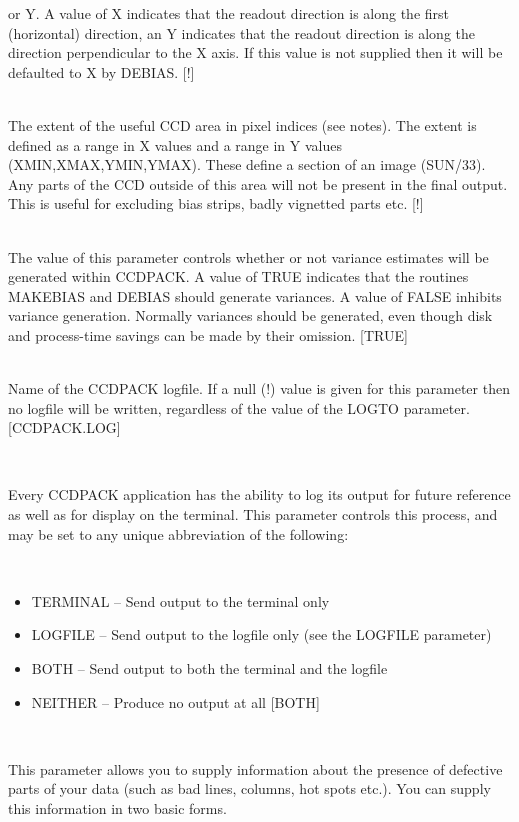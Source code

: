 \documentclass[twoside,11pt]{article}
\newcommand{\htmlref}[2]{#1}
\newcommand{\xlabel}[1]{}
\renewcommand{\_}{\texttt{\symbol{95}}}
\newcommand{\xroutine}[1]{\htmlref{{\sc #1}}{#1}}
\newcommand{\sstsubsection}[1]{ \item[{#1}] \mbox{} \\}
\newcommand{\sstitemlist}[1]{
  \mbox{} \\
  \vspace{-3.5ex}
  \begin{itemize}
     #1
  \end{itemize}
}
\newcommand{\sstitem}{\item}
\newcommand{\sstsubsection}[1]{\item[{#1}]}
\newcommand{\sstitemlist}[1]{
      \begin{itemize}
         #1
      \end{itemize}
      \\
   }
\newcommand{\sstitem}{\item}
\begin{document}
{{{         or Y.  A value of X indicates that the readout direction is
         along the first (horizontal) direction, an Y indicates that
         the readout direction is along the direction perpendicular to
         the X axis. If this value is not supplied then it will be
         defaulted to X by \xroutine{DEBIAS}.
         [!]
      }
      \sstsubsection{
         \xlabel{CCDextent}
         EXTENT( 4 ) = \_INTEGER (Read and Write)
      } {
         The extent of the useful CCD area in pixel indices (see notes).
         The extent is defined as a range in X values and a range in Y
         values (XMIN,XMAX,YMIN,YMAX). These define a section of an image
         (SUN/33). Any parts of the CCD outside of this area will not
         be present in the final output. This is useful for excluding
         bias strips, badly vignetted parts etc.
         [!]
      }
      \sstsubsection{
         GENVAR = \_LOGICAL (Read and Write)
      } {
         The value of this parameter controls whether or not variance
         estimates will be generated within CCDPACK. A value of TRUE
         indicates that the routines \xroutine{MAKEBIAS} and \xroutine{DEBIAS} should generate
         variances. A value of FALSE inhibits variance generation.
         Normally variances should be generated, even though disk and
         process-time savings can be made by their omission.
         [TRUE]
      }
      \sstsubsection{
         LOGFILE = FILENAME (Read and Write)
      } {
         Name of the CCDPACK logfile.  If a null (!) value is given for
         this parameter then no logfile will be written, regardless of
         the value of the LOGTO parameter.
         [CCDPACK.LOG]
      }
      \sstsubsection{
         LOGTO = LITERAL (Read and Write)
      } {
         Every CCDPACK application has the ability to log its output
         for future reference as well as for display on the terminal.
         This parameter controls this process, and may be set to any
         unique abbreviation of the following:
         \sstitemlist{

            \sstitem
               TERMINAL  -- Send output to the terminal only

            \sstitem
               LOGFILE   -- Send output to the logfile only (see the
                               LOGFILE parameter)

            \sstitem
               BOTH      -- Send output to both the terminal and the
                               logfile

            \sstitem
               NEITHER   -- Produce no output at all
            [BOTH]
         }
      }
      \sstsubsection{
         MASK = LITERAL (Read and Write)
      } {
         This parameter allows you to supply information about the
         presence of defective parts of your data (such as bad lines,
         columns, hot spots etc.). You can supply this information in
         two basic forms.

}}}
\end{document}
